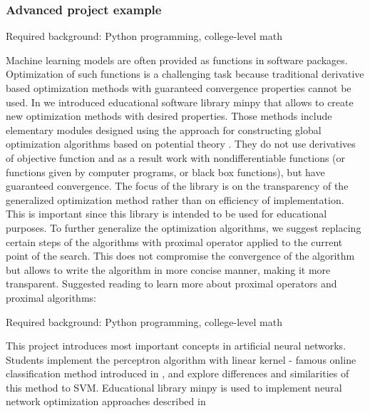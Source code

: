       \subsubsection{Advanced project example \label{advannced project example} }





Required background: Python programming, college-level math

Machine learning models are often provided as functions in software packages. Optimization of such functions is a challenging task because traditional derivative based optimization methods with guaranteed convergence properties cannot be used. In \cite{MP} we introduced educational software library minpy that allows to create new optimization methods with desired properties. Those methods include elementary modules designed using the approach for constructing global optimization algorithms based on potential theory \cite{KAP1,KAP2}. They do not use derivatives of objective function and as a result work with nondifferentiable functions (or functions given by computer programs, or black box functions), but have guaranteed convergence. The focus of the library is on the transparency of the generalized optimization method rather than on efficiency of implementation. This is important since this library is intended to be used for educational purposes. To further generalize the optimization algorithms, we suggest replacing certain steps of the algorithms with proximal operator applied to the current point of the search. This does not compromise the convergence of the algorithm  \cite{KAP3}  but allows to write the algorithm in more concise manner, making it more transparent. Suggested reading to learn more about proximal operators and proximal algorithms: \cite{LAKLG,RGMN,SGFLZ}





Required background: Python programming, college-level math

This project introduces most important concepts in artificial neural networks.
Students implement the perceptron algorithm with linear kernel - famous online classification method introduced in  \cite{ABR}, and explore differences and similarities of this method to SVM. Educational library minpy  \cite{NU} is used to implement neural network optimization approaches described in \cite{YZWQ,YZWQ1.KP1}



